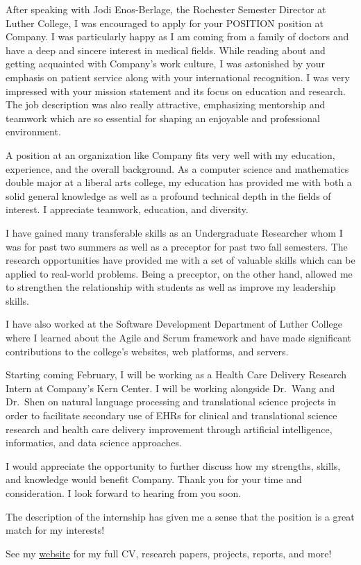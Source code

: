 \documentclass[a4paper,11pt,sans]{moderncv}
\date{\today}
\begin{document}
\makelettertitle%

\justify%

After speaking with Jodi Enos-Berlage, the Rochester Semester Director at
Luther College, I was encouraged to apply for your POSITION position at
Company. I was particularly happy as I am coming from a family of doctors and
have a deep and sincere interest in medical fields. While reading about and
getting acquainted with Company's work culture, I was astonished by your
emphasis on patient service along with your international recognition. I was
very impressed with your mission statement and its focus on education and
research.  The job description was also really attractive, emphasizing
mentorship and teamwork which are so essential for shaping an enjoyable and
professional environment.

A position at an organization like Company fits very well with my education,
experience, and the overall background. As a computer science and mathematics
double major at a liberal arts college, my education has provided me with both
a solid general knowledge as well as a profound technical depth in the fields
of interest. I appreciate teamwork, education, and diversity.

I have gained many transferable skills as an Undergraduate Researcher whom I
was for past two summers as well as a preceptor for past two fall semesters.
The research opportunities have provided me with a set of valuable skills which
can be applied to real-world problems. Being a preceptor, on the other hand,
allowed me to strengthen the relationship with students as well as improve my
leadership skills.

I have also worked at the Software Development Department of Luther College
where I learned about the Agile and Scrum framework and have made significant
contributions to the college's websites, web platforms, and servers.

Starting coming February, I will be working as a Health Care Delivery Research
Intern at Company's Kern Center. I will be working alongside Dr.~Wang and
Dr.~Shen on natural language processing and translational science projects in
order to facilitate secondary use of EHRs for clinical and translational
science research and health care delivery improvement through artificial
intelligence, informatics, and data science approaches.

I would appreciate the opportunity to further discuss how my strengths, skills,
and knowledge would benefit Company. Thank you for your time and consideration.
I look forward to hearing from you soon.

The description of the internship has given me a sense that the position is a
great match for my interests!

See my \href{https://www.davidoniani.com}{website} for my full CV, research
papers, projects, reports, and more!

\makeletterclosing%
\end{document}
